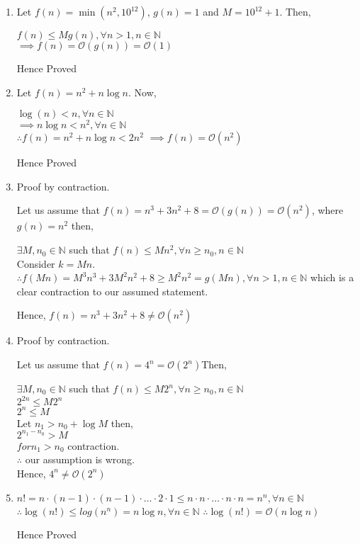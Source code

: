 \documentclass[10pt, a4paper]{article}
\newcommand{\BigO}{\mathcal{O}}
\begin{document}
\begin{enumerate}[label=\alph*)]
    \item 
    Let $f(n) = \min(n^2, 10^{12})$, $g(n) = 1$ and $M = 10^{12}+1$. Then,

    $f(n)\leq Mg(n), \forall n > 1, n\in \mathbb{N}$\\
    $\implies f(n) = \mathcal{O}(g(n)) = \mathcal{O}(1)$

    Hence Proved

    \item
    Let $f(n) = n^2 + n\log n$. Now,

    $\log (n) < n,\forall n \in \mathbb{N}$\\
    $\implies n\log n<n^2 ,\forall n \in \mathbb{N}$\\
    $\therefore f(n) = n^2 + n\log n < 2n^2$
    $\implies f(n) = \mathcal{O}(n^2)$

    Hence Proved

    \item 
    Proof by contraction.

    Let us assume that $f(n) = n^3 + 3n^2 + 8 = \mathcal{O}(g(n)) = \mathcal{O}(n^2)$, where $g(n) = n^2$ then,

    $\exists M, n_0 \in \mathbb{N}$ such that $f(n) \leq Mn^2, \forall n \geq n_0, n\in \mathbb{N}$\\
    Consider $k = Mn$.\\
    $\therefore f(Mn) = M^3n^3 +3 M^2n^2 + 8 \geq M^2n^2 = g(Mn), \forall n>1, n \in \mathbb{N}$ which is a clear contraction to our assumed statement.

    Hence, $f(n) = n^3 +3n^2 + 8 \neq \mathcal{O}(n^2)$

    \item 
    Proof by contraction.

    Let us assume that $f(n) = 4^n = \BigO(2^n)$Then,

    $\exists M, n_0 \in \mathbb{N}$ such that $f(n) \leq M2^n, \forall n \geq n_0, n\in \mathbb{N}$\\
    $2^{2n}\leq M2^n$\\
    $2^n \leq M $\\
    Let $n_1> n_0+\log M$ then,\\
    $2^{n_1-n_0}>M$\\
    $for n_1 > n_0$ contraction.\\
    $\therefore$ our assumption is wrong.\\
    Hence, $ 4^n \neq \BigO(2^n)$

    \item 
    $n! = n\cdot(n-1)\cdot(n-1)\cdot\dots\cdot2\cdot1 \leq n\cdot n \cdot \dots \cdot n \cdot n = n^n, \forall n \in \mathbb{N}$\\
    $\therefore \log(n!) \leq log(n^n) = n\log n, \forall n \in \mathbb{N}$
    $\therefore \log(n!) = \mathcal{O}(n\log n)$

    Hence Proved
\end{enumerate}
\end{document}
